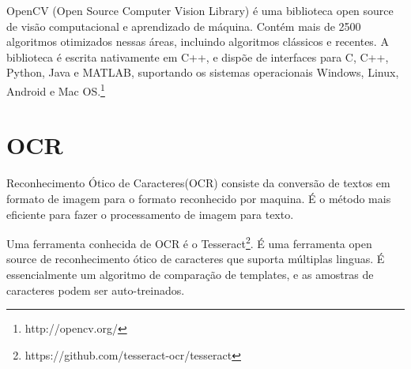 OpenCV (Open Source Computer Vision Library) é uma biblioteca open source de
visão computacional e aprendizado de máquina. Contém mais de 2500 algoritmos
otimizados nessas áreas, incluindo algoritmos clássicos e recentes. A biblioteca
é escrita nativamente em C++, e dispõe de interfaces para C, C++, Python, Java e
MATLAB, suportando os sistemas operacionais Windows, Linux, Android e Mac
OS.\footnote{http://opencv.org/}

\section{OCR}
\label{sec:ocr}

Reconhecimento Ótico de Caracteres(OCR) consiste da conversão de textos em
formato de imagem para o formato reconhecido por maquina. É o método mais
eficiente para fazer o processamento de imagem para
texto.~\cite{mohit2015designing}

Uma ferramenta conhecida de OCR é o
Tesseract\footnote{https://github.com/tesseract-ocr/tesseract}. É uma ferramenta
open source de reconhecimento ótico de caracteres que suporta múltiplas linguas.
É essencialmente um algoritmo de comparação de templates, e as amostras de
caracteres podem ser auto-treinados.~\cite{ho2016intelligent}


